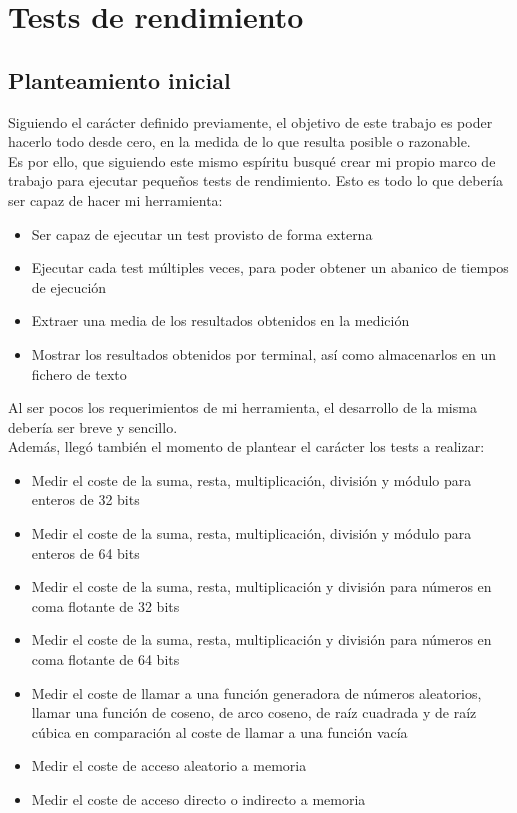 \chapter{Tests de rendimiento}

\section{Planteamiento inicial}

Siguiendo el carácter definido previamente, el objetivo de este trabajo es poder hacerlo todo desde cero, en la medida de lo que resulta posible o razonable.\\

Es por ello, que siguiendo este mismo espíritu busqué crear mi propio marco de trabajo para ejecutar pequeños tests de rendimiento. Esto es todo lo que debería ser capaz de hacer mi herramienta:

\begin{itemize}
	\item Ser capaz de ejecutar un test provisto de forma externa
	\item Ejecutar cada test múltiples veces, para poder obtener un abanico de tiempos de ejecución
	\item Extraer una media de los resultados obtenidos en la medición
	\item Mostrar los resultados obtenidos por terminal, así como almacenarlos en un fichero de texto
\end{itemize}

Al ser pocos los requerimientos de mi herramienta, el desarrollo de la misma debería ser breve y sencillo.\\

Además, llegó también el momento de plantear el carácter los tests a realizar:

\begin{itemize}
	\item Medir el coste de la suma, resta, multiplicación, división y módulo para enteros de 32 bits
	\item Medir el coste de la suma, resta, multiplicación, división y módulo para enteros de 64 bits
	\item Medir el coste de la suma, resta, multiplicación y división para números en coma flotante de 32 bits
	\item Medir el coste de la suma, resta, multiplicación y división para números en coma flotante de 64 bits
	\item Medir el coste de llamar a una función generadora de números aleatorios, llamar una función de coseno, de arco coseno, de raíz cuadrada y de raíz cúbica en comparación al coste de llamar a una función vacía
	\item Medir el coste de acceso aleatorio a memoria
	\item Medir el coste de acceso directo o indirecto a memoria
\end{itemize}

